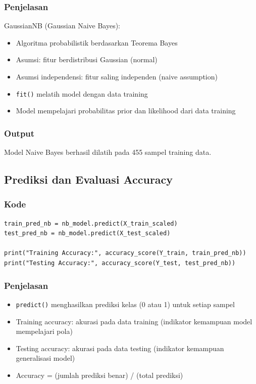 \documentclass[12pt,a4paper]{article}
\begin{document}
\subsubsection{Penjelasan}
GaussianNB (Gaussian Naive Bayes):
\begin{itemize}
    \item Algoritma probabilistik berdasarkan Teorema Bayes
    \item Asumsi: fitur berdistribusi Gaussian (normal)
    \item Asumsi independensi: fitur saling independen (naive assumption)
    \item \texttt{fit()} melatih model dengan data training
    \item Model mempelajari probabilitas prior dan likelihood dari data training
\end{itemize}

\subsubsection{Output}
Model Naive Bayes berhasil dilatih pada 455 sampel training data.

\subsection{Prediksi dan Evaluasi Accuracy}

\subsubsection{Kode}
\begin{lstlisting}[style=pythonstyle]
train_pred_nb = nb_model.predict(X_train_scaled)
test_pred_nb = nb_model.predict(X_test_scaled)

print("Training Accuracy:", accuracy_score(Y_train, train_pred_nb))
print("Testing Accuracy:", accuracy_score(Y_test, test_pred_nb))
\end{lstlisting}

\subsubsection{Penjelasan}
\begin{itemize}
    \item \texttt{predict()} menghasilkan prediksi kelas (0 atau 1) untuk setiap sampel
    \item Training accuracy: akurasi pada data training (indikator kemampuan model mempelajari pola)
    \item Testing accuracy: akurasi pada data testing (indikator kemampuan generalisasi model)
    \item Accuracy = (jumlah prediksi benar) / (total prediksi)
\end{itemize}
\end{document}
